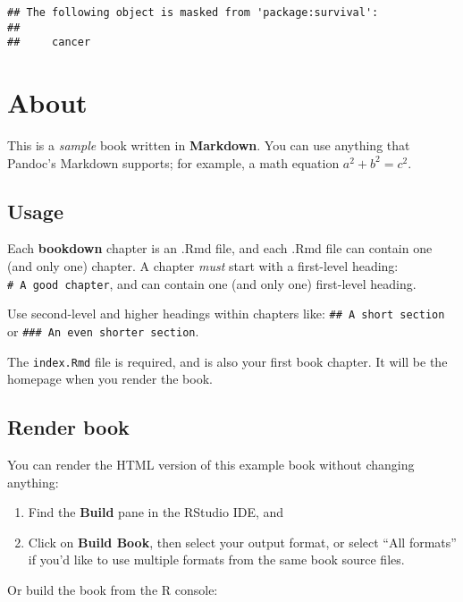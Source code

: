 \documentclass[
]{book}
\theoremstyle{definition}
\theoremstyle{definition}
\theoremstyle{definition}
\theoremstyle{definition}
\theoremstyle{remark}
\begin{document}
\begin{verbatim}
## The following object is masked from 'package:survival':
## 
##     cancer
\end{verbatim}

\hypertarget{about}{%
\chapter*{About}\label{about}}

This is a \emph{sample} book written in \textbf{Markdown}. You can use anything that Pandoc's Markdown supports; for example, a math equation \(a^2 + b^2 = c^2\).

\hypertarget{usage}{%
\section*{Usage}\label{usage}}

Each \textbf{bookdown} chapter is an .Rmd file, and each .Rmd file can contain one (and only one) chapter. A chapter \emph{must} start with a first-level heading: \texttt{\#\ A\ good\ chapter}, and can contain one (and only one) first-level heading.

Use second-level and higher headings within chapters like: \texttt{\#\#\ A\ short\ section} or \texttt{\#\#\#\ An\ even\ shorter\ section}.

The \texttt{index.Rmd} file is required, and is also your first book chapter. It will be the homepage when you render the book.

\hypertarget{render-book}{%
\section*{Render book}\label{render-book}}

You can render the HTML version of this example book without changing anything:

\begin{enumerate}
\def\labelenumi{\arabic{enumi}.}
\item
  Find the \textbf{Build} pane in the RStudio IDE, and
\item
  Click on \textbf{Build Book}, then select your output format, or select ``All formats'' if you'd like to use multiple formats from the same book source files.
\end{enumerate}

Or build the book from the R console:
\end{document}
